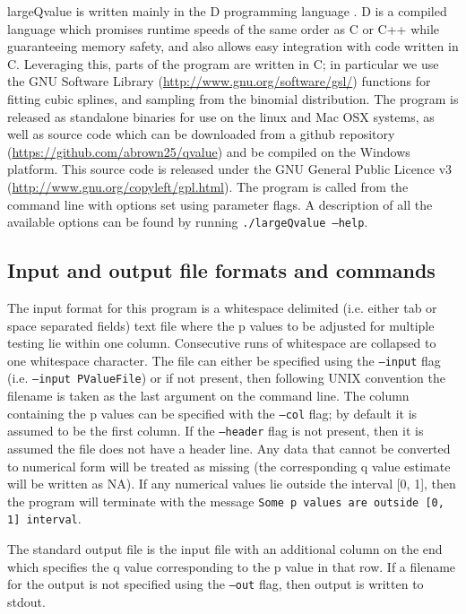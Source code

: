\documentclass{amsart}
\begin{document}
largeQvalue is written mainly in the D programming language \citep{dlang}. D is a compiled language which promises runtime speeds of the same order as C or C++ while guaranteeing memory safety, and also allows easy integration with code written in C. Leveraging this, parts of the program are written in C; in particular we use the GNU Software Library (\url{http://www.gnu.org/software/gsl/}) functions for fitting cubic splines, and sampling from the binomial distribution. The program is released as standalone binaries for use on the linux and Mac OSX systems, as well as source code which can be downloaded from a github repository (\url{https://github.com/abrown25/qvalue}) and be compiled on the Windows platform. This source code is released under the GNU General Public Licence v3 (\url{http://www.gnu.org/copyleft/gpl.html}). The program is called from the command line with options set using parameter flags. A description of all the available options can be found by running \texttt{./largeQvalue --help}.

\subsection{Input and output file formats and commands}

The input format for this program is a whitespace delimited (i.e. either tab or space separated fields) text file where the p values to be adjusted for multiple testing lie within one column. Consecutive runs of whitespace are collapsed to one whitespace character. The file can either be specified using the \texttt{--input} flag (i.e. \texttt{--input PValueFile}) or if not present, then following UNIX convention the filename is taken as the last argument on the command line. The column containing the p values can be specified with the \texttt{--col} flag; by default it is assumed to be the first column. If the \texttt{--header} flag is not present, then it is assumed the file does not have a header line. Any data that cannot be converted to numerical form will be treated as missing (the corresponding q value estimate will be written as NA). If any numerical values lie outside the interval [0, 1], then the program will terminate with the message \texttt{Some p values are outside [0, 1] interval}.

The standard output file is the input file with an additional column on the end which specifies the q value \citep{storeydirect} corresponding to the p value in that row. If a filename for the output is not specified using the \texttt{--out} flag, then output is written to stdout.
\end{document}
